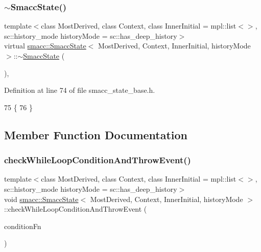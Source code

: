 \subsubsection{\texorpdfstring{$\sim$\+Smacc\+State()}{~SmaccState()}}
{\footnotesize\ttfamily template$<$class Most\+Derived, class Context, class Inner\+Initial = mpl\+::list$<$$>$, sc\+::history\+\_\+mode history\+Mode = sc\+::has\+\_\+deep\+\_\+history$>$ \\
virtual \hyperlink{classsmacc_1_1SmaccState}{smacc\+::\+Smacc\+State}$<$ Most\+Derived, Context, Inner\+Initial, history\+Mode $>$\+::$\sim$\hyperlink{classsmacc_1_1SmaccState}{Smacc\+State} (\begin{DoxyParamCaption}{ }\end{DoxyParamCaption})\hspace{0.3cm}{\ttfamily [inline]}, {\ttfamily [virtual]}}



Definition at line 74 of file smacc\+\_\+state\+\_\+base.\+h.


\begin{DoxyCode}
75   \{
76   \}
\end{DoxyCode}


\subsection{Member Function Documentation}
\mbox{\label{classsmacc_1_1SmaccState_a80082718f226bebedb589f0c4696001d}} 
\subsubsection{\texorpdfstring{check\+While\+Loop\+Condition\+And\+Throw\+Event()}{checkWhileLoopConditionAndThrowEvent()}}
{\footnotesize\ttfamily template$<$class Most\+Derived, class Context, class Inner\+Initial = mpl\+::list$<$$>$, sc\+::history\+\_\+mode history\+Mode = sc\+::has\+\_\+deep\+\_\+history$>$ \\
void \hyperlink{classsmacc_1_1SmaccState}{smacc\+::\+Smacc\+State}$<$ Most\+Derived, Context, Inner\+Initial, history\+Mode $>$\+::check\+While\+Loop\+Condition\+And\+Throw\+Event (\begin{DoxyParamCaption}\item[{\hyperlink{classbool}{bool}(Most\+Derived\+::$\ast$)()}]{condition\+Fn }\end{DoxyParamCaption})\hspace{0.3cm}{\ttfamily [inline]}}



